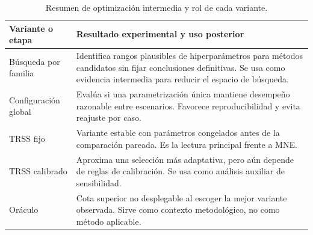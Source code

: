 \begin{table}[htbp]
\centering
\small
\setlength{\tabcolsep}{5pt}
\caption{Resumen de optimización intermedia y rol de cada variante.}
\label{tab:ch4_intermediate_optimization_summary}
\begin{tabular}{@{}>{\raggedright\arraybackslash}p{3.2cm}>{\raggedright\arraybackslash}p{8.1cm}@{}}
\toprule
Variante o etapa & Resultado experimental y uso posterior \\
\midrule
Búsqueda por familia & Identifica rangos plausibles de hiperparámetros para métodos candidatos sin fijar conclusiones definitivas. Se usa como evidencia intermedia para reducir el espacio de búsqueda. \\
Configuración global & Evalúa si una parametrización única mantiene desempeño razonable entre escenarios. Favorece reproducibilidad y evita reajuste por caso. \\
TRSS fijo & Variante estable con parámetros congelados antes de la comparación pareada. Es la lectura principal frente a MNE. \\
TRSS calibrado & Aproxima una selección más adaptativa, pero aún depende de reglas de calibración. Se usa como análisis auxiliar de sensibilidad. \\
Oráculo & Cota superior no desplegable al escoger la mejor variante observada. Sirve como contexto metodológico, no como método aplicable. \\
\bottomrule
\end{tabular}
\end{table}
